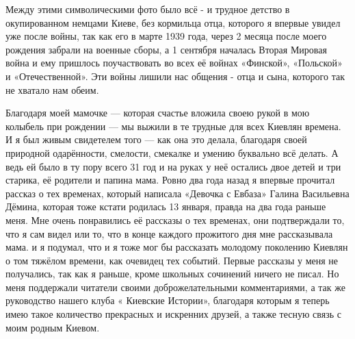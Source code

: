 \begin{multicols}{3}





\end{multicols} %

Между этими символическими фото  было всё - и трудное детство в окупированном
немцами Киеве, без кормильца отца, которого я впервые увидел уже после войны,
так как его в марте 1939 года, через 2 месяца после моего рождения забрали на
военные сборы, а  1 сентября началась Вторая Мировая война и ему пришлось
поучаствовать  во всех её войнах «Финской», «Польской» и «Отечественной». Эти
войны лишили нас общения - отца и сына, которого так не  хватало нам обеим.

Благодаря моей мамочке — которая счастье вложила своею рукой в мою колыбель при
рождении — мы выжили в те трудные для всех Киевлян времена.  И я был живым
свидетелем того — как она это делала, благодаря своей природной одарённости,
смелости, смекалке и умению  буквально всё делать. А ведь ей было  в ту пору
всего 31 год и на руках у неё остались двое детей и три старика, её родители и
папина мама. Ровно два года назад я впервые прочитал рассказ о тех временах,
который написала «Девочка с Евбаза» Галина Васильевна  Дёмина, которая тоже
кстати родилась 13 января, правда на два года раньше меня. Мне очень
понравились её рассказы  о тех временах, они подтверждали то, что я сам видел
или то, что в конце каждого прожитого дня мне рассказывала мама. и я подумал,
что и я  тоже мог бы  рассказать молодому поколению Киевлян  о том тяжёлом
времени, как очевидец тех событий. Первые рассказы у меня не получались,  так
как я раньше, кроме школьных сочинений ничего не писал. Но меня поддержали
читатели  своими доброжелательными комментариями, а так же руководство нашего
клуба « Киевские Истории», благодаря которым я теперь имею такое количество
прекрасных и искренних  друзей, а также тесную  связь с моим родным Киевом.

